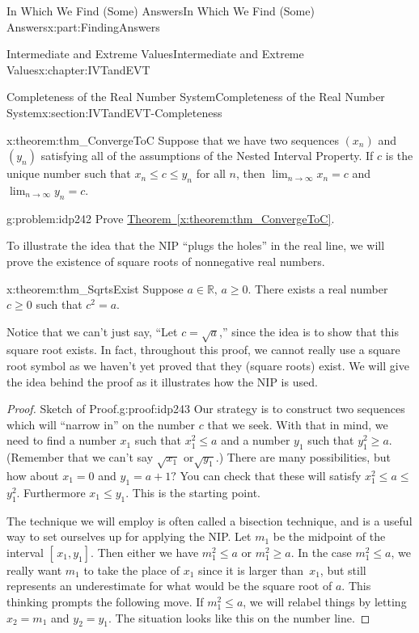 \documentclass[oneside,10pt,]{book}
\newcommand{\xreffont}{\relax}
\numberwithin{equation}{section}
\begin{document}
\begin{partptx}{In Which We Find (Some) Answers}{}{In Which We Find (Some) Answers}{}{}{x:part:FindingAnswers}
\begin{chapterptx}{Intermediate and Extreme Values}{}{Intermediate and Extreme Values}{}{}{x:chapter:IVTandEVT}
\begin{sectionptx}{Completeness of the Real Number System}{}{Completeness of the Real Number System}{}{}{x:section:IVTandEVT-Completeness}
\begin{theorem}{}{}{x:theorem:thm_ConvergeToC}
 Suppose that we have two sequences \(\left(x_n\right)\) and \(\left(y_n\right)\) satisfying all of the assumptions of the Nested Interval Property. If \(c\) is the unique number such that \(x_n\leq c\leq y_n\) for all \(n\), then \(\lim_{n\rightarrow\infty}x_n=c\) and \(\lim_{n\rightarrow\infty}y_n=c\).%
\end{theorem}
\begin{problem}{}{g:problem:idp242}%
 Prove \hyperref[x:theorem:thm_ConvergeToC]{Theorem~{\xreffont\ref{x:theorem:thm_ConvergeToC}}}.%
\end{problem}
To illustrate the idea that the NIP ``plugs the holes'' in the real line, we will prove the existence of square roots of nonnegative real numbers.%
\begin{theorem}{}{}{x:theorem:thm_SqrtsExist}%
%
Suppose \(a\in\mathbb{R},\,a\geq 0\). There exists a real number \(c\geq 0\) such that \(c^2=a\).%
\end{theorem}
Notice that we can't just say, ``Let \(c=\sqrt{a}\),'' since the idea is to show that this square root exists. In fact, throughout this proof, we cannot really use a square root symbol as we haven't yet proved that they (square roots) exist. We will give the idea behind the proof as it illustrates how the NIP is used.%
\begin{proof}{Sketch of Proof.}{g:proof:idp243}
Our strategy is to construct two sequences which will ``narrow in'' on the number \(c\) that we seek. With that in mind, we need to find a number \(x_1\) such that \(x_1^2\leq a\) and a number \(y_1\) such that \(y_1^2\geq a\). (Remember that we can't say \(\sqrt{x_1}\) or\(\sqrt{y_1}\).) There are many possibilities, but how about \(x_1=0\) and \(y_1=a+1?\) You can check that these will satisfy \(x_1^2\leq a\leq\) \(y_1^2\). Furthermore \(x_1\leq y_1\). This is the starting point.%
\par
The technique we will employ is often called a bisection technique, and is a useful way to set ourselves up for applying the NIP. Let \(m_1\) be the midpoint of the interval \([\,x_1,y_1]\). Then either we have \(m_1^2\leq a\) or \(m_1^2\geq a\). In the case \(m_1^2\leq a\), we really want \(m_1\) to take the place of \(x_1\) since it is larger than \(\,x_1\), but still represents an underestimate for what would be the square root of \(a\). This thinking prompts the following move. If \(m_1^2\leq a\), we will relabel things by letting \(x_2=m_1\) and \(y_2=y_1\). The situation looks like this on the number line.%

\end{proof}
\end{sectionptx}
\end{chapterptx}
\end{partptx}
\end{document}
